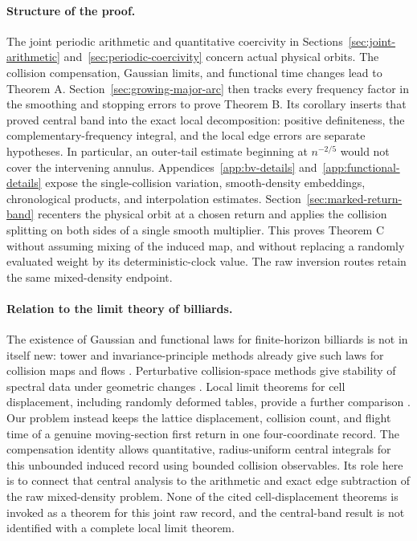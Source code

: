 \documentclass[11pt,reqno]{amsart}
\numberwithin{equation}{section}
\theoremstyle{definition}\newtheorem{definition}[theorem]{Definition}
\theoremstyle{remark}\newtheorem{remark}[theorem]{Remark}
\begin{document}
\paragraph{Structure of the proof.}
The joint periodic arithmetic and quantitative coercivity in
Sections~\ref{sec:joint-arithmetic} and~\ref{sec:periodic-coercivity}
concern actual physical orbits. The collision compensation, Gaussian
limits, and functional time changes lead to Theorem A.
Section~\ref{sec:growing-major-arc} then tracks every frequency factor
in the smoothing and stopping errors to prove Theorem B. Its corollary
inserts that proved central band into the exact local decomposition:
positive definiteness, the complementary-frequency integral, and the
local edge errors are separate hypotheses. In particular, an outer-tail
estimate beginning at $n^{-2/5}$ would not cover the intervening annulus.
Appendices~\ref{app:bv-details} and~\ref{app:functional-details} expose
the single-collision variation, smooth-density embeddings,
chronological products, and interpolation estimates. Section~\ref{sec:marked-return-band} recenters the physical orbit at a
chosen return and applies the collision splitting on both sides of a
single smooth multiplier. This proves Theorem C without assuming
mixing of the induced map, and without replacing a randomly evaluated
weight by its deterministic-clock value. The raw inversion routes
retain the same mixed-density endpoint.

\paragraph{Relation to the limit theory of billiards.}
The existence of Gaussian and functional laws for finite-horizon
billiards is not in itself new: tower and invariance-principle methods
already give such laws for collision maps and flows
\cite{Young,MN}. Perturbative collision-space methods give stability of
spectral data under geometric changes \cite{DZ}. Local limit theorems
for cell displacement, including randomly deformed tables, provide a
further comparison \cite{SV,DPZ}. Our problem instead keeps the lattice
displacement, collision count, and flight time of a genuine moving-section
first return in one four-coordinate record. The compensation identity
allows quantitative, radius-uniform central integrals for this
unbounded induced record using bounded collision observables. Its role
here is to connect that central analysis to the arithmetic and exact
edge subtraction of the raw mixed-density problem. None of the cited
cell-displacement theorems is invoked as a theorem for this joint raw
record, and the central-band result is not identified with a complete
local limit theorem.
\end{document}
